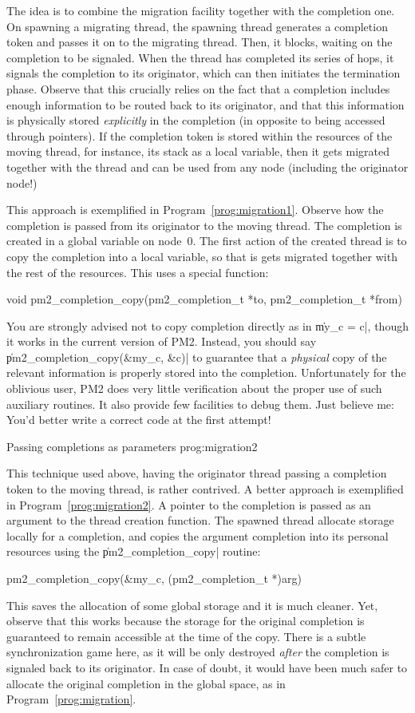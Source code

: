 The idea is to combine the migration facility together with the
completion one. On spawning a migrating thread, the spawning thread
generates a completion token and passes it on to the migrating thread.
Then, it blocks, waiting on the completion to be signaled. When the
thread has completed its series of hops, it signals the completion to
its originator, which can then initiates the termination phase.
Observe that this crucially relies on the fact that a completion
includes enough information to be routed back to its originator, and
that this information is physically stored \emph{explicitly} in the
completion (in opposite to being accessed through pointers).  If the
completion token is stored within the resources of the moving thread,
for instance, its stack as a local variable, then it gets migrated
together with the thread and can be used from any node (including the
originator node!)

This approach is exemplified in Program~\ref{prog:migration1}. Observe
how the completion is passed from its originator to the moving thread.
The completion is created in a global variable on node~0. The first
action of the created thread is to copy the completion into a local
variable, so that is gets migrated together with the rest of the
resources. This uses a special function: 
\begin{program}
void pm2_completion_copy(pm2_completion_t *to, 
                         pm2_completion_t *from)
\end{program}
You are strongly advised not to copy completion directly as in
\|my_c = c|, though it works in the current version of PM2.
Instead, you should say \|pm2_completion_copy(&my_c, &c)| to
guarantee that a \emph{physical} copy of the relevant information is
properly stored into the completion. Unfortunately for the oblivious
user, PM2 does very little verification about the proper use of such
auxiliary routines. It also provide few facilities to debug them.
Just believe me: You'd better write a correct code at the first
attempt!

 {Passing completions as
  parameters} {prog:migration2}

This technique used above, having the originator thread passing a
completion token to the moving thread, is rather contrived. A better
approach is exemplified in Program~\ref{prog:migration2}. A pointer to
the completion is passed as an argument to the thread creation
function. The spawned thread allocate storage locally for a
completion, and copies the argument completion into its personal
resources using the \|pm2_completion_copy| routine:
\begin{program}
pm2_completion_copy(&my_c, (pm2_completion_t *)arg)
\end{program}
This saves the allocation of some global storage and it is much
cleaner. Yet, observe that this works because the storage for the
original completion is guaranteed to remain accessible at the time of
the copy. There is a subtle synchronization game here, as it will be
only destroyed \emph{after} the completion is signaled back to its
originator. In case of doubt, it would have been much safer to
allocate the original completion in the global space, as in
Program~\ref{prog:migration}.

